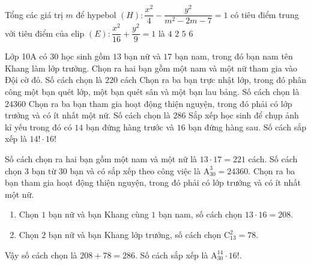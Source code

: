 \begin{ex}%
Tổng các giá trị $m$ để hypebol $(H)\colon \dfrac{x^2}{4}-\dfrac{y^2}{m^2-2m-7}=1$ có tiêu điểm trung với tiêu điểm của elip $(E)\colon\dfrac{x^2}{16}+\dfrac{y^2}{9}=1$ là
\choice
{$4$}
{\True $2$}
{$5$}
{$6$}
\end{ex}

\TNTF
\begin{ex}%
Lớp 10A có $30$ học sinh gồm $13$ bạn nữ và $17$ bạn nam, trong đó bạn nam tên Khang làm lớp trưởng.
\choiceTF
{Chọn ra hai bạn gồm một nam và một nữ tham gia vào Đội cờ đỏ. Số cách chọn là $220$ cách}
{\True Chọn ra ba bạn trực nhật lớp, trong đó phân công một bạn quét lớp, một bạn quét sân và một bạn lau bảng. Số cách chọn là $24360$}
{\True Chọn ra ba bạn tham gia hoạt động thiện nguyện, trong đó phải có lớp trưởng và có ít nhất một nữ. Số cách chọn là $286$}
{Sắp xếp học sinh để chụp ảnh kỉ yếu trong đó có $14$ bạn đứng hàng trước và $16$ bạn đứng hàng sau. Số cách sắp xếp là $14!\cdot 16!$}
\loigiai
{
\begin{itemchoice}
\itemch Số cách chọn ra hai bạn gồm một nam và một nữ là $13\cdot 17=221$ cách.
\itemch Số cách chọn $3$ bạn từ $30$ bạn và có sắp xếp theo công việc là $\mathrm{A}_{30}^3=24360$.
\itemch Chọn ra ba bạn tham gia hoạt động thiện nguyện, trong đó phải có lớp trưởng và có ít nhất một nữ.
\begin{enumerate}[TH 1.]
\item Chọn $1$ bạn nữ và bạn Khang cùng $1$ bạn nam, số cách chọn $13\cdot 16=208$.
\item Chọn $2$ bạn nữ và bạn Khang lớp trưởng, số cách chọn $\mathrm{C}_{13}^{2}=78$.
\end{enumerate}
Vậy số cách chọn là $208+78=286$.
\itemch Số cách sắp xếp là $\mathrm{A}_{30}^{14}\cdot 16!$.
\end{itemchoice}
}
\end{ex}

